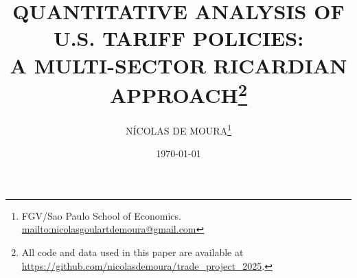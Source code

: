 \documentclass[a4paper, 12pt]{article}
\begin{document}
\title{\normalsize\MakeUppercase{\bfseries 
 Quantitative Analysis of U.S. Tariff Policies:\\A Multi-Sector Ricardian Approach}\footnote{All code and data used in this paper are available at \url{https://github.com/nicolasdemoura/trade_project_2025}.}}
\date{\footnotesize\MakeUppercase\today}
\author{
    \small\MakeUppercase{Nícolas de Moura}\footnote{FGV/Sao Paulo School of Economics. \url{mailto:nicolasgoulartdemoura@gmail.com}}
}
\maketitle










\newpage



\newpage


% 
%
\end{document}
